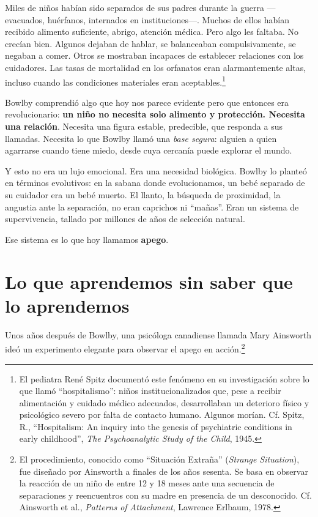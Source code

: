Miles de niños habían sido separados de sus padres durante la guerra ---evacuados, huérfanos, internados en instituciones---. Muchos de ellos habían recibido alimento suficiente, abrigo, atención médica. Pero algo les faltaba. No crecían bien. Algunos dejaban de hablar, se balanceaban compulsivamente, se negaban a comer. Otros se mostraban incapaces de establecer relaciones con los cuidadores. Las tasas de mortalidad en los orfanatos eran alarmantemente altas, incluso cuando las condiciones materiales eran aceptables.\footnote{El pediatra René Spitz documentó este fenómeno en su investigación sobre lo que llamó ``hospitalismo'': niños institucionalizados que, pese a recibir alimentación y cuidado médico adecuados, desarrollaban un deterioro físico y psicológico severo por falta de contacto humano. Algunos morían. Cf. Spitz, R., ``Hospitalism: An inquiry into the genesis of psychiatric conditions in early childhood'', \textit{The Psychoanalytic Study of the Child}, 1945.}

Bowlby comprendió algo que hoy nos parece evidente pero que entonces era revolucionario: \textbf{un niño no necesita solo alimento y protección. Necesita una relación}. Necesita una figura estable, predecible, que responda a sus llamadas. Necesita lo que Bowlby llamó una \textit{base segura}: alguien a quien agarrarse cuando tiene miedo, desde cuya cercanía puede explorar el mundo.

Y esto no era un lujo emocional. Era una necesidad biológica. Bowlby lo planteó en términos evolutivos: en la sabana donde evolucionamos, un bebé separado de su cuidador era un bebé muerto. El llanto, la búsqueda de proximidad, la angustia ante la separación, no eran caprichos ni ``mañas''. Eran un sistema de supervivencia, tallado por millones de años de selección natural.

Ese sistema es lo que hoy llamamos \textbf{apego}.

\section{Lo que aprendemos sin saber que lo aprendemos}

Unos años después de Bowlby, una psicóloga canadiense llamada Mary Ainsworth ideó un experimento elegante para observar el apego en acción.\footnote{El procedimiento, conocido como ``Situación Extraña'' (\textit{Strange Situation}), fue diseñado por Ainsworth a finales de los años sesenta. Se basa en observar la reacción de un niño de entre 12 y 18 meses ante una secuencia de separaciones y reencuentros con su madre en presencia de un desconocido. Cf. Ainsworth et al., \textit{Patterns of Attachment}, Lawrence Erlbaum, 1978.}

